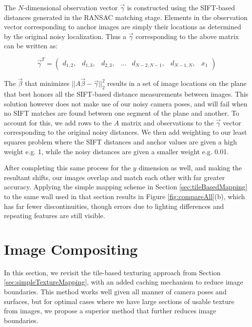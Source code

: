 \documentclass[]{spie}  %
\begin{document}
The $N$-dimensional observation vector $\vec{\gamma}$ is constructed
using the SIFT-based distances generated in the RANSAC matching
stage. Elements in the observation vector corresponding to anchor
images are simply their locations as determined by the original noisy
localization. Thus a $\vec{\gamma}$ corresponding to the above matrix
can be written as:

\[
\vec{\gamma}^T =
\begin{pmatrix}
  d_{1,2}, &d_{1,3}, &d_{2,3}, &\hdots &d_{N-2,N-1}, &d_{N-1,N}, &x_1
\end{pmatrix}
\]

The $\vec{\beta}$ that minimizes $||A \vec{\beta} -
\vec{\gamma}||_2^2$ results in a set of image locations on the plane
that best honors all the SIFT-based distance measurements between
images. This solution however does not make use of our noisy camera
poses, and will fail when no SIFT matches are found between one
segment of the plane and another. To account for this, we add rows to
the $A$ matrix and observations to the $\vec{\gamma}$ vector
corresponding to the original noisy distances. We then add weighting
to our least squares problem where the SIFT distances and anchor
values are given a high weight e.g. 1, while the noisy distances are
given a smaller weight e.g. 0.01.

After completing this same process for the $y$ dimension as well, and
making the resultant shifts, our images overlap and match each other
with far greater accuracy. Applying the simple mapping scheme in
Section \ref{sec:tileBasedMapping} to the same wall used in that
section results in Figure \ref{fig:compareAll}(b), which has far fewer
discontinuities, though errors due to lighting differences and
repeating features are still visible.

\section{Image Compositing}
\label{sec:imageCompositing}
In this section, we revisit the tile-based texturing approach from
Section \ref{sec:simpleTextureMapping}, with an added caching
mechanism to reduce image boundaries. This method works well given all
manner of camera poses and surfaces, but for optimal cases where we
have large sections of usable texture from images, we propose a
superior method that further reduces image boundaries.
\end{document}
